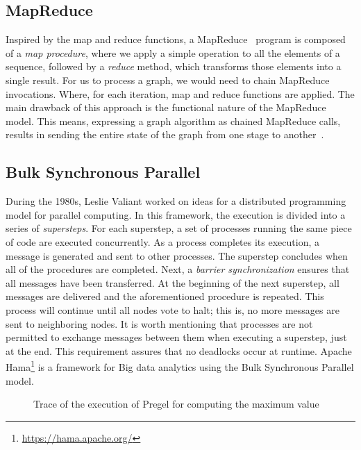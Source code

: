 \subsection{MapReduce}
\label{section:mapReduce}

Inspired by the map and reduce functions, a MapReduce~\cite{wiki:MapReduce} program is composed of a \textit{map procedure}, where we apply a simple operation to all the elements of a sequence, followed by a \textit{reduce} method, which transforms those elements into a single result. For us to process a graph, we would need to chain MapReduce invocations. Where, for each iteration, map and reduce functions are applied. The main drawback of this approach is the functional nature of the MapReduce model. This means, expressing a graph algorithm as chained MapReduce calls, results in sending the entire state of the graph from one stage to another~\cite{10.1145/1807167.1807184}.

\subsection{Bulk Synchronous Parallel}

During the 1980s, Leslie Valiant worked on ideas for a distributed programming model for parallel computing. In this framework, the execution is divided into a series of \textit{supersteps}. For each superstep, a set of processes running the same piece of code are executed concurrently. As a process completes its execution, a message is generated and sent to other processes. The superstep concludes when all of the procedures are completed. Next, a \textit{barrier synchronization} ensures that all messages have been transferred. At the beginning of the next superstep, all messages are delivered and the aforementioned procedure is repeated. This process will continue until all nodes vote to halt; this is, no more messages are sent to neighboring nodes. It is worth mentioning that processes are not permitted to exchange messages between them when executing a superstep, just at the end. This requirement assures that no deadlocks occur at runtime. Apache Hama\footnote{\url{https://hama.apache.org/}} is a framework for Big data analytics using the Bulk Synchronous Parallel model.

\begin{figure}[ht]
    \centering
    
    \caption[Trace of the execution of Pregel for computing the maximum value]{Trace of the execution of Pregel for computing the maximum value~\cite{10.1145/1807167.1807184}}
    \label{fig:pregel}
\end{figure}

